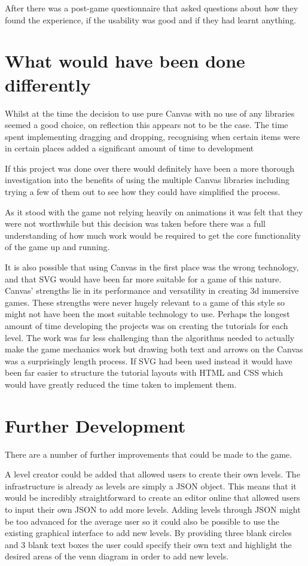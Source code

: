 \documentclass[12pt,a4paper]{report}
\begin{document}
After there was a post-game questionnaire that asked questions about how they found the experience, if the usability was good and if they had learnt anything.

\section{What would have been done differently}

Whilst at the time the decision to use pure Canvas with no use of any libraries seemed a good choice, on reflection this appears not to be the case. The time spent implementing dragging and dropping, recognising when certain items were in certain places added a significant amount of time to development

If this project was done over there would definitely have been a more thorough investigation into the benefits of using the multiple Canvas libraries including trying a few of them out to see how they could have simplified the process. 

As it stood with the game not relying heavily on animations it was felt that they were not worthwhile but this decision was taken before there was a full understanding of how much work would be required to get the core functionality of the game up and running. 

It is also possible that using Canvas in the first place was the wrong technology, and that SVG would have been far more suitable for a game of this nature. Canvas' strengths lie in its performance and versatility in creating 3d immersive games. These strengths were never hugely relevant to a game of this style so might not have been the most suitable technology to use. Perhaps the longest amount of time developing the projects was on creating the tutorials for each level. The work was far less challenging than the algorithms needed to actually make the game mechanics work but drawing both text and arrows on the Canvas was a surprisingly length process. If SVG had been used instead it would have been far easier to structure the tutorial layouts with HTML and CSS which would have greatly reduced the time taken to implement them.


\section{Further Development}
There are a number of further improvements that could be made to the game.

A level creator could be added that allowed users to create their own levels. The infrastructure is already as levels are simply a JSON object. This means that it would be incredibly straightforward to create an editor online that allowed users to input their own JSON to add more levels. Adding levels through JSON might be too advanced for the average user so it could also be possible to use the existing graphical interface to add new levels. By providing three blank circles and 3 blank text boxes the user could specify their own text and highlight the desired areas of the venn diagram in order to add new levels. 


 
\end{document}
